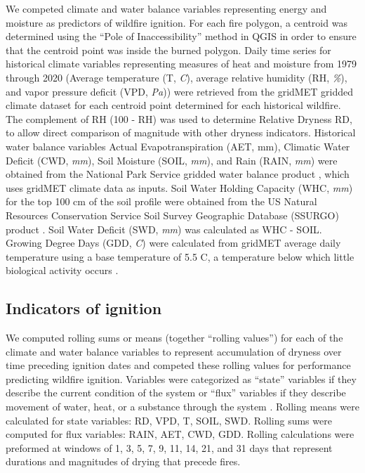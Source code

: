 \documentclass[11p]{article}
\begin{document}

We competed climate and water balance variables representing energy and moisture as predictors of wildfire ignition. For each fire polygon, a centroid was determined using the ``Pole of Inaccessibility'' method in QGIS \citep{QGIS_software} in order to ensure that the centroid point was inside the burned polygon. Daily time series for historical climate variables representing measures of heat and moisture from 1979 through 2020 (Average temperature (T, \textit{\degree C}), average relative humidity (RH, \textit{\%}), and vapor pressure deficit (VPD, \textit{Pa})) were retrieved from the gridMET gridded climate dataset \citep{abatzoglouDevelopmentGriddedSurface2013} for each centroid point determined for each historical wildfire. The complement of RH (100 - RH) was used to determine Relative Dryness RD, to allow direct comparison of magnitude with other dryness indicators. Historical water balance variables Actual Evapotranspiration (AET, mm), Climatic Water Deficit (CWD, \textit{mm}), Soil Moisture (SOIL, \textit{mm}), and Rain (RAIN, \textit{mm}) were obtained from the National Park Service gridded water balance product \citep{tercekHistoricalChangesPlant2021}, which uses gridMET climate data as inputs. Soil Water Holding Capacity (WHC, \textit{mm}) for the top 100 cm of the soil profile were obtained from the US Natural Resources Conservation Service 
Soil Survey Geographic Database (SSURGO) product \citep{naturalresourcesconservationserviceSoilSurveyGeographic2015}. Soil Water Deficit (SWD, \textit{mm}) was calculated as WHC - SOIL. Growing Degree Days (GDD, \textit{\degree C}) were calculated from gridMET average daily temperature using a base temperature of 5.5 \degree C, a temperature below which little biological activity occurs \citep{mcmasterGrowingDegreedaysOne1997}. 

\subsection{Indicators of ignition}

We computed rolling sums or means (together ``rolling values'') for each of the climate and water balance variables to represent accumulation of dryness over time preceding ignition dates and competed these rolling values for performance predicting wildfire ignition. Variables were categorized as ``state'' variables if they describe the current condition of the system or ``flux'' variables if they describe movement of water, heat, or a substance through the system \citep{wangInterplaysStateFlux2019,dingmanPhysicalHydrology2015}. Rolling means were calculated for state variables: RD, VPD, T, SOIL, SWD. Rolling sums were computed for flux variables: RAIN, AET, CWD, GDD. Rolling calculations were preformed at windows of 1, 3, 5, 7, 9, 11, 14, 21, and 31 days that represent durations and magnitudes of drying that precede fires.
\end{document}
